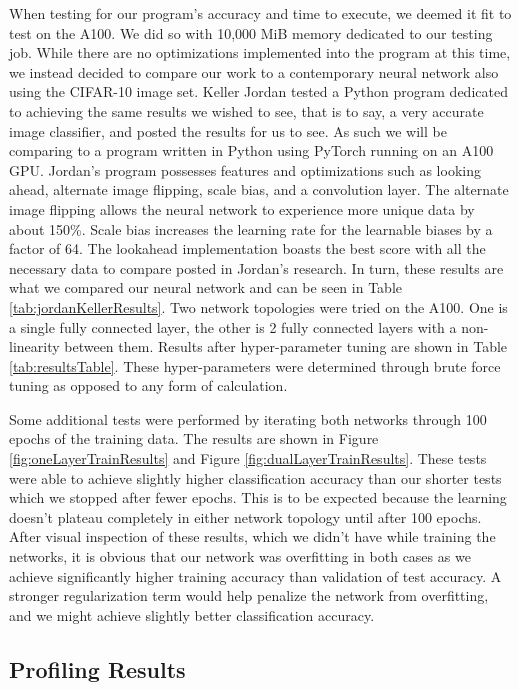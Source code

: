 \documentclass[conference]{IEEEtran}
\begin{document}
When testing for our program's accuracy and time to execute, we deemed it fit to test on the A100. We did so with 10,000 MiB memory dedicated to our testing job. While there are no optimizations implemented into the program at this time, we instead decided to compare our work to a contemporary neural network also using the CIFAR-10 image set. Keller Jordan tested a Python program dedicated to achieving the same results we wished to see, that is to say, a very accurate image classifier, and posted the results for us to see\cite{b5}. As such we will be comparing to a program written in Python using PyTorch running on an A100 GPU. Jordan's program possesses features and optimizations such as looking ahead, alternate image flipping, scale bias, and a convolution layer. The alternate image flipping allows the neural network to experience more unique data by about 150\%. Scale bias increases the learning rate for the learnable biases by a factor of 64. The lookahead implementation boasts the best score with all the necessary data to compare posted in Jordan's research. In turn, these results are what we compared our neural network and can be seen in Table \ref{tab:jordanKellerResults}. Two network topologies were tried on the A100. One is a single fully connected layer, the other is 2 fully connected layers with a non-linearity between them. Results after hyper-parameter tuning are shown in Table \ref{tab:resultsTable}. These hyper-parameters were determined through brute force tuning as opposed to any form of calculation.

Some additional tests were performed by iterating both networks through 100 epochs of the training data. The results are shown in Figure \ref{fig:oneLayerTrainResults} and Figure \ref{fig:dualLayerTrainResults}. These tests were able to achieve slightly higher classification accuracy than our shorter tests which we stopped after fewer epochs. This is to be expected because the learning doesn't plateau completely in either network topology until after 100 epochs. After visual inspection of these results, which we didn't have while training the networks, it is obvious that our network was overfitting in both cases as we achieve significantly higher training accuracy than validation of test accuracy. A stronger regularization term would help penalize the network from overfitting, and we might achieve slightly better classification accuracy. 

\subsection{Profiling Results}
\end{document}
